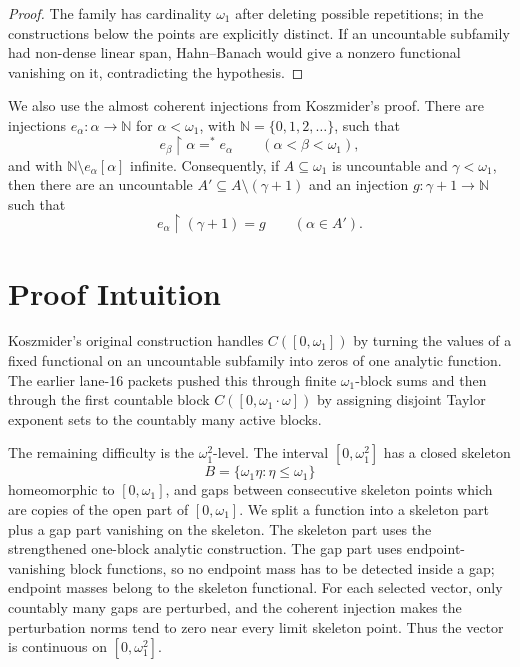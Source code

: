 \documentclass[11pt]{article}
\newcommand{\N}{\mathbb N}
\begin{document}
\begin{proof}
The family has cardinality \(\omega_1\) after deleting possible repetitions;
in the constructions below the points are explicitly distinct.  If an
uncountable subfamily had non-dense linear span, Hahn--Banach would give a
nonzero functional vanishing on it, contradicting the hypothesis.
\end{proof}

We also use the almost coherent injections from Koszmider's proof.  There are
injections \(e_\alpha:\alpha\to\N\) for \(\alpha<\omega_1\), with
\(\N=\{0,1,2,\ldots\}\), such that
\[
   e_\beta\!\upharpoonright\alpha =^* e_\alpha
   \qquad(\alpha<\beta<\omega_1),
\]
and with \(\N\setminus e_\alpha[\alpha]\) infinite.  Consequently, if
\(A\subseteq\omega_1\) is uncountable and \(\gamma<\omega_1\), then there are
an uncountable \(A'\subseteq A\setminus(\gamma+1)\) and an injection
\(g:\gamma+1\to\N\) such that
\[
   e_\alpha\!\upharpoonright(\gamma+1)=g
   \qquad(\alpha\in A').
\]

\section{Proof Intuition}

Koszmider's original construction handles \(C([0,\omega_1])\) by turning the
values of a fixed functional on an uncountable subfamily into zeros of one
analytic function.  The earlier lane-16 packets pushed this through finite
\(\omega_1\)-block sums and then through the first countable block
\(C([0,\omega_1\cdot\omega])\) by assigning disjoint Taylor exponent sets to
the countably many active blocks.

The remaining difficulty is the \(\omega_1^2\)-level.  The interval
\([0,\omega_1^2]\) has a closed skeleton
\[
   B=\{\omega_1\eta:\eta\leq\omega_1\}
\]
homeomorphic to \([0,\omega_1]\), and gaps between consecutive skeleton points
which are copies of the open part of \([0,\omega_1]\).  We split a function
into a skeleton part plus a gap part vanishing on the skeleton.  The skeleton
part uses the strengthened one-block analytic construction.  The gap part uses
endpoint-vanishing block functions, so no endpoint mass has to be detected
inside a gap; endpoint masses belong to the skeleton functional.  For each
selected vector, only countably many gaps are perturbed, and the coherent
injection makes the perturbation norms tend to zero near every limit skeleton
point.  Thus the vector is continuous on \([0,\omega_1^2]\).
\end{document}
